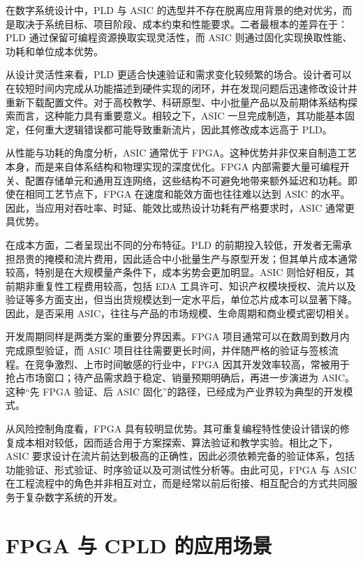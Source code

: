 在数字系统设计中，PLD 与 ASIC
的选型并不存在脱离应用背景的绝对优劣，而是取决于系统目标、项目阶段、成本约束和性能要求。二者最根本的差异在于：PLD
通过保留可编程资源换取实现灵活性，而 ASIC
则通过固化实现换取性能、功耗和单位成本优势。

从设计灵活性来看，PLD
更适合快速验证和需求变化较频繁的场合。设计者可以在较短时间内完成从功能描述到硬件实现的闭环，并在发现问题后迅速修改设计并重新下载配置文件。对于高校教学、科研原型、中小批量产品以及前期体系结构探索而言，这种能力具有重要意义。相较之下，ASIC
一旦完成制造，其功能基本固定，任何重大逻辑错误都可能导致重新流片，因此其修改成本远高于
PLD。

从性能与功耗的角度分析，ASIC 通常优于
FPGA。这种优势并非仅来自制造工艺本身，而是来自体系结构和物理实现的深度优化。FPGA
内部需要大量可编程开关、配置存储单元和通用互连网络，这些结构不可避免地带来额外延迟和功耗。即使在相同工艺节点下，FPGA
在速度和能效方面也往往难以达到 ASIC
的水平。因此，当应用对吞吐率、时延、能效比或热设计功耗有严格要求时，ASIC
通常更具优势。

在成本方面，二者呈现出不同的分布特征。PLD
的前期投入较低，开发者无需承担昂贵的掩模和流片费用，因此适合中小批量生产与原型开发；但其单片成本通常较高，特别是在大规模量产条件下，成本劣势会更加明显。ASIC
则恰好相反，其前期非重复性工程费用较高，包括 EDA
工具许可、知识产权模块授权、流片以及验证等多方面支出，但当出货规模达到一定水平后，单位芯片成本可以显著下降。因此，是否采用
ASIC，往往与产品的市场规模、生命周期和商业模式密切相关。

开发周期同样是两类方案的重要分界因素。FPGA
项目通常可以在数周到数月内完成原型验证，而 ASIC
项目往往需要更长时间，并伴随严格的验证与签核流程。在竞争激烈、上市时间敏感的行业中，FPGA
因其开发效率较高，常被用于抢占市场窗口；待产品需求趋于稳定、销量预期明确后，再进一步演进为
ASIC。这种``先 FPGA 验证、后 ASIC
固化''的路径，已经成为产业界较为典型的开发模式。

从风险控制角度看，FPGA
具有较明显优势。其可重复编程特性使设计错误的修复成本相对较低，因而适合用于方案探索、算法验证和教学实验。相比之下，ASIC
要求设计在流片前达到极高的正确性，因此必须依赖完备的验证体系，包括功能验证、形式验证、时序验证以及可测试性分析等。由此可见，FPGA
与 ASIC
在工程流程中的角色并非相互对立，而是经常以前后衔接、相互配合的方式共同服务于复杂数字系统的开发。

\section{FPGA 与 CPLD
的应用场景}\label{fpga-ux4e0e-cpld-ux7684ux5e94ux7528ux573aux666f}

